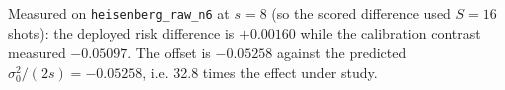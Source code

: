 Measured on \texttt{heisenberg\_raw\_n6} at $s=8$ (so the scored difference used $S=16$ shots): the deployed risk difference is $+0.00160$ while the calibration contrast measured $-0.05097$. The offset is $-0.05258$ against the predicted $\sigma_0^2/(2s)=-0.05258$, i.e. 32.8 times the effect under study.
